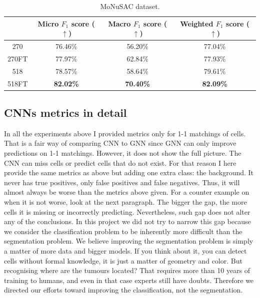 \begin{table}[ht]
\vspace{0.5cm}

\begin{tabular}{c|c|c|c|}
  \cline{2-4}
  & Micro $F_1$ score ($\uparrow$) & Macro $F_1$ score ($\uparrow$) & Weighted $F_1$ score ($\uparrow$)  \\ \hline
\multicolumn{1}{|c|}{270}  & 76.46\% & 56.20\% & 77.04\% \\ \hline
\multicolumn{1}{|c|}{270FT}  & 77.97\% & 62.84\% & 77.93\% \\ \hline
\multicolumn{1}{|c|}{518}  & 78.57\% & 58.64\% & 79.61\% \\ \hline
\multicolumn{1}{|c|}{518FT}  & \textbf{82.02\%} & \textbf{70.40\%} & \textbf{82.09\%} \\ \hline
\end{tabular}
\caption{MoNuSAC dataset.}
    \label{tab:scaling}
\end{table}

\newpage
\subsection{CNNs metrics in detail}

In all the experiments above I provided metrics only for 1-1 matchings of cells. That is a fair way of comparing CNN to GNN since GNN can only improve predictions on 1-1 matchings. However, it does not show the full picture. The CNN can miss cells or predict cells that do not exist. For that reason I here provide the same metrics as above but adding one extra class: the background. It never has true positives, only false positives and false negatives. Thus, it will almost always be worse than the metrics above given. For a counter example on when it is not worse, look at the next paragraph. The bigger the gap, the more cells it is missing or incorrectly predicting. Nevertheless, such gap does not alter any of the conclusions. In this project we did not try to narrow this gap because we consider the classification problem to be inherently more difficult than the segmentation problem. We believe improving the segmentation problem is simply a matter of more data and bigger models. If you think about it, you can detect cells without formal knowledge, it is just a matter of geometry and color. But recognising where are the tumours located? That requires more than 10 years of training to humans, and even in that case experts still have doubts. Therefore we directed our efforts toward improving the classification, not the segmentation.

